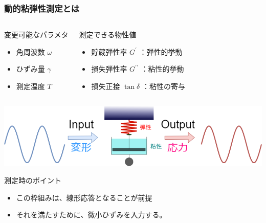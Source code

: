 \documentclass[unicode,12pt]{beamer}%
\begin{document}
\begin{frame}
	\frametitle{動的粘弾性測定とは}

		\vspace{-5mm}
	\begin{columns}[T, onlytextwidth]
			\begin{exampleblock}{変更可能なパラメタ}
				\begin{itemize}
				\item 角周波数 $\omega$
				\item ひずみ量 $\gamma$
				\item 測定温度 $T$
				\end{itemize}
			\end{exampleblock}
			\begin{block}{測定できる物性値}
				\begin{itemize}
				\item 貯蔵弾性率 $G^{\prime}$ ：弾性的挙動
				\item 損失弾性率 $G^{\prime \prime}$ ：粘性的挙動
				\item 損失正接 $\tan \delta$ ：粘性の寄与
				\end{itemize}
			\end{block}
	\end{columns}

		\vspace{3mm}
			\centering
				\includegraphics[width=.9\textwidth]{dynamic_ViscoElast_2.png}
		
	\begin{alertblock}{測定時のポイント}
		\begin{itemize}
			\item この枠組みは、線形応答となることが前提
			\item それを満たすために、微小ひずみを入力する。
		\end{itemize}
	\end{alertblock}
\end{frame}
\end{document}
